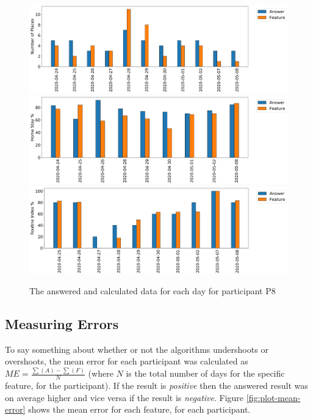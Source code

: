 \begin{figure}[h]
    \centering
    \includegraphics[width=\textwidth]{images/study/places_ec110976-0192-436d-b451-4f5dd97e71d8.png}
    \includegraphics[width=\textwidth]{images/study/homestay_ec110976-0192-436d-b451-4f5dd97e71d8.png}
    \includegraphics[width=\textwidth]{images/study/routine_ec110976-0192-436d-b451-4f5dd97e71d8.png}
    \caption{The answered and calculated data for each day for participant P8}
    \label{fig:plot-p8-features}
\end{figure}
\subsection{Measuring Errors}

To say something about whether or not the algorithms undershoots or overshoots, the mean error for each participant was calculated as $ME = \frac{\sum(A) - \sum(F)}{N}$ (where $N$ is the total number of days for the specific feature, for the participant). If the result is \textit{positive} then the answered result was on average higher and vice versa if the result is \textit{negative}. Figure \ref{fig:plot-mean-error} shows the mean error for each feature, for each participant.\\

